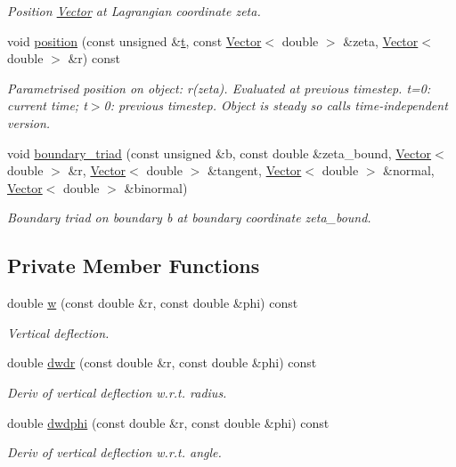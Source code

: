 \begin{DoxyCompactItemize}
\begin{DoxyCompactList}\small\item\em Position \hyperlink{classoomph_1_1Vector}{Vector} at Lagrangian coordinate zeta. \end{DoxyCompactList}\item 
void \hyperlink{classoomph_1_1WarpedCircularDisk_afcc9e5e2c88d05b61006bd432e3aa31b}{position} (const unsigned \&\hyperlink{cfortran_8h_af6f0bd3dc13317f895c91323c25c2b8f}{t}, const \hyperlink{classoomph_1_1Vector}{Vector}$<$ double $>$ \&zeta, \hyperlink{classoomph_1_1Vector}{Vector}$<$ double $>$ \&r) const
\begin{DoxyCompactList}\small\item\em Parametrised position on object\+: r(zeta). Evaluated at previous timestep. t=0\+: current time; t$>$0\+: previous timestep. Object is steady so calls time-\/independent version. \end{DoxyCompactList}\item 
void \hyperlink{classoomph_1_1WarpedCircularDisk_aa24472806fff65e4950d71dd9536965f}{boundary\+\_\+triad} (const unsigned \&b, const double \&zeta\+\_\+bound, \hyperlink{classoomph_1_1Vector}{Vector}$<$ double $>$ \&r, \hyperlink{classoomph_1_1Vector}{Vector}$<$ double $>$ \&tangent, \hyperlink{classoomph_1_1Vector}{Vector}$<$ double $>$ \&normal, \hyperlink{classoomph_1_1Vector}{Vector}$<$ double $>$ \&binormal)
\begin{DoxyCompactList}\small\item\em Boundary triad on boundary b at boundary coordinate zeta\+\_\+bound. \end{DoxyCompactList}\end{DoxyCompactItemize}
\subsection*{Private Member Functions}
\begin{DoxyCompactItemize}
\item 
double \hyperlink{classoomph_1_1WarpedCircularDisk_abbb6f07ee89b3b87fa2edfee44beb7c9}{w} (const double \&r, const double \&phi) const
\begin{DoxyCompactList}\small\item\em Vertical deflection. \end{DoxyCompactList}\item 
double \hyperlink{classoomph_1_1WarpedCircularDisk_aed38bcf8e10ffcc2f978037d7201d6d2}{dwdr} (const double \&r, const double \&phi) const
\begin{DoxyCompactList}\small\item\em Deriv of vertical deflection w.\+r.\+t. radius. \end{DoxyCompactList}\item 
double \hyperlink{classoomph_1_1WarpedCircularDisk_a130db675bf148aa0a19395411dd5d3ce}{dwdphi} (const double \&r, const double \&phi) const
\begin{DoxyCompactList}\small\item\em Deriv of vertical deflection w.\+r.\+t. angle. \end{DoxyCompactList}\end{DoxyCompactItemize}
